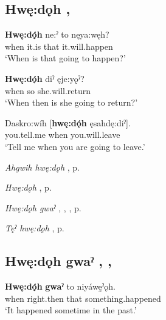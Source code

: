 \subsection*{\textbf{Hwę:dǫh} , } \label{p:[hwę:dǫh]}

\ea
\label{ex:hpar61}
\gll \textbf{Hwę:dǫ́h} ne:ˀ to nęya:węh?\\
when it.is that it.will.happen\\
\glt ‘When is that going to happen?’
\z


\ea
\label{ex:hpar62}
\gll \textbf{Hwę:dǫ́h} diˀ ęje:yǫˀ?\\
when so she.will.return\\
\glt ‘When then is she going to return?’
\z


\ea
\label{ex:hpar63}
\gll Daskro:wíh [\textbf{hwę:dǫ́h} ęsahdę:diˀ].\\
you.tell.me when you.will.leave\\
\glt ‘Tell me when you are going to leave.’
\z


\begin{CayugaRelated}
\item \textit{Ahgwih hwę:dǫh} , p. \pageref{p:[ahgwih hwę:dǫh]}\\
\item \textit{Hwę:dǫh} , p. \pageref{p:[hwę:dǫh]}\\
\item \textit{Hwę:dǫh gwaˀ} , , , p. \pageref{p:[hwę:dǫh gwaˀ]}\\
\item \textit{Tęˀ hwę:dǫh} , p. \pageref{p:[tęˀ hwę:dǫh]}
\end{CayugaRelated}

\subsection*{\textbf{Hwę:dǫh gwaˀ} , , } \label{p:[hwę:dǫh gwaˀ]}

\ea
\label{ex:hpar64}
\gll \textbf{Hwę:dǫ́h} \textbf{gwaˀ} to niyáwę̱ˀǫh.\\
when right.then that something.happened\\
\glt ‘It happened sometime in the past.’
\z


